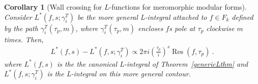 \documentclass[11pt]{article}
\newtheorem{corollary}[theorem]{Corollary}
\numberwithin{equation}{section}  %
\newcommand{\HH}{\mathbb{H}}
\newcommand{\ZZ}{\mathbb{Z}}
\newcommand{\CC}{\mathbb{C}}
\DeclareMathOperator{\Res}{Res}
\begin{document}
\begin{corollary}[Wall crossing for $L$-functions for meromorphic modular forms]\label{corr:wall-crossing}
Consider $L^*(f, s; \gamma^T_i)$ be the more general L-integral attached to $f \in F_k$ defined by the path $\gamma^T_i(\tau_p, m)$, where $\gamma^T_i(\tau_p, m)$ encloses $f$s pole at $\tau_p$ clockwise $m$ times. Then,
\begin{align}
L^*(f, s) - L^*(f, s; \gamma^T_i) \propto 2 \pi i \left(\frac{\tau_p}{i}\right)^s \Res(f, \tau_p)~.
\end{align}
where $L^*(f, s)$ is the the canonical L-integral of Theorem~\ref{genericLthm} and $L^*(f, s; \gamma^T_i)$ is the L-integral on this more general contour. %

\end{corollary}
\end{document}
